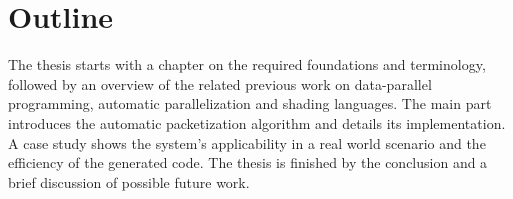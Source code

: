 


\section*{Outline}
The thesis starts with a chapter on the required foundations and terminology, followed by an overview of the related previous work on data-parallel programming, automatic parallelization and shading languages.
The main part introduces the automatic packetization algorithm and details its implementation.
A case study shows the system's applicability in a real world scenario and the efficiency of the generated code.
The thesis is finished by the conclusion and a brief discussion of possible future work. %